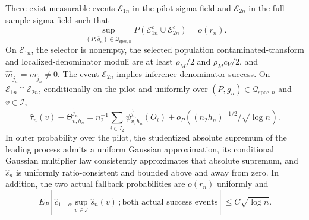 There exist measurable events \(\mathcal E_{1n}\) in the pilot sigma-field and \(\mathcal E_{2n}\) in the full sample sigma-field such that
\[
 \sup_{(P,\bar g_n)\in\mathcal Q_{\mathrm{spec},n}}
 P(\mathcal E_{1n}^c\cup\mathcal E_{2n}^c)=o(r_n).
\]
On \(\mathcal E_{1n}\), the selector is nonempty, the selected population contaminated-transform and localized-denominator moduli are at least \(\rho_M/2\) and \(\rho_Mc_V/2\), and \(\widehat m_{\widehat j_n}=m_{\widehat j_n}\ne0\). The event \(\mathcal E_{2n}\) implies inference-denominator success. On \(\mathcal E_{1n}\cap\mathcal E_{2n}\), conditionally on the pilot and uniformly over \((P,\bar g_n)\in\mathcal Q_{\mathrm{spec},n}\) and \(v\in\mathcal I\),
\[
 \widehat\tau_n(v)-\Theta^{\widehat j_n}_{v,h_n}
 =n_2^{-1}\sum_{i\in I_2}\psi^{\widehat j_n}_{v,h_n}(O_i)
 +o_P\!\left((n_2h_n)^{-1/2}/\sqrt{\log n}\right).
\]
In outer probability over the pilot, the studentized absolute supremum of the leading process admits a uniform Gaussian approximation, its conditional Gaussian multiplier law consistently approximates that absolute supremum, and \(\widehat s_n\) is uniformly ratio-consistent and bounded above and away from zero. In addition, the two actual fallback probabilities are \(o(r_n)\) uniformly and
\[
 E_P\!\left[\widehat c_{1-\alpha}\sup_{v\in\mathcal I}\widehat s_n(v)\,; \text{both actual success events}\right]\le C\sqrt{\log n}.
\]